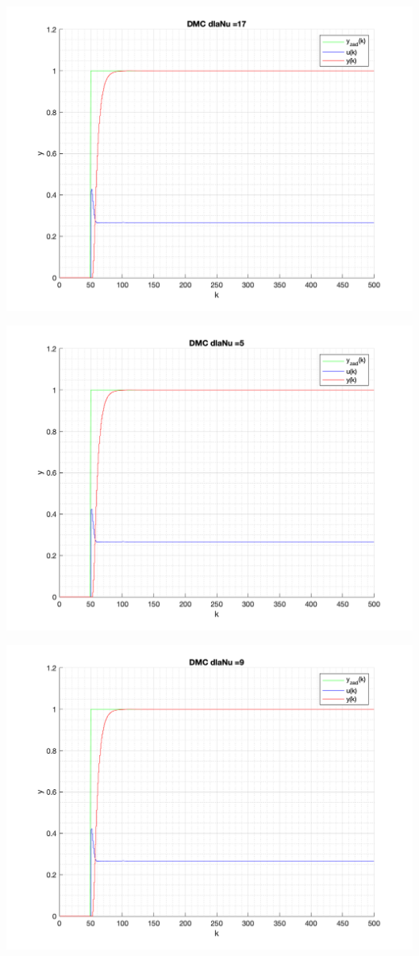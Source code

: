 \documentclass[a4paper, 11pt]{article}
\begin{document}
\begin{enumerate}
 \includegraphics[width=\linewidth]{./ModelsP4_Nu/P4_DMC_Nu_17_png.png} 
 
 \includegraphics[width=\linewidth]{./ModelsP4_Nu/P4_DMC_Nu_5_png.png} 
 
 \includegraphics[width=\linewidth]{./ModelsP4_Nu/P4_DMC_Nu_9_png.png} 
 

\end{enumerate}
\end{document}
